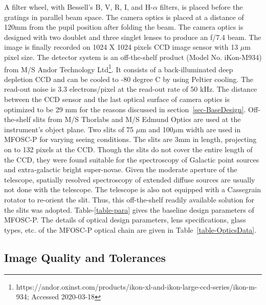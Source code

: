 \par
A filter wheel, with Bessell’s B, V, R, I, and H-$\alpha$ filters, is placed before the gratings in parallel beam space. The camera optics is placed at a distance of 120mm from the pupil position after folding the beam. The camera optics is designed with two doublet and three singlet lenses to produce an f/7.4 beam. The image is finally recorded on 1024 X 1024 pixels CCD image sensor with 13 $\mu$m pixel size. The detector system is an off-the-shelf product (Model No. iKon-M934) from M/S Andor Technology Ltd\footnote{https://andor.oxinst.com/products/ikon-xl-and-ikon-large-ccd-series/ikon-m-934; Accessed 2020-03-18}. It consists of a back-illuminated deep depletion CCD and can be cooled to -80 degree C by using Peltier cooling. The read-out noise is 3.3 electrons/pixel at the read-out rate of 50 kHz. The distance between the CCD sensor and the last optical surface of camera optics is optimized to be 29 mm for the reasons discussed in section~\ref{sec-BaseDesign}. Off-the-shelf slits from M/S Thorlabs and M/S Edmund Optics are used at the instrument's object plane. Two slits of 75 $\mu$m and 100$\mu$m width are used in MFOSC-P for varying seeing conditions. The slits are 3mm in length, projecting on to 132 pixels at the CCD. Though the slits do not cover the entire length of the CCD, they were found suitable for the spectroscopy of Galactic point sources and extra-galactic bright super-novae. Given the moderate aperture of the telescope, spatially resolved spectroscopy of extended diffuse sources are usually not done with the telescope. The telescope is also not equipped with a Cassegrain rotator to re-orient the slit. Thus, this off-the-shelf readily available solution for the slits was adopted. Table-\ref{table-para} gives the baseline design parameters of MFOSC-P. The details of optical design parameters, lens specifications, glass types, etc. of the MFOSC-P optical chain are given in Table~\ref{table-OpticsData}.

\par
\subsection{Image Quality and Tolerances} 
\label{subsec-IQandTol}
\par

